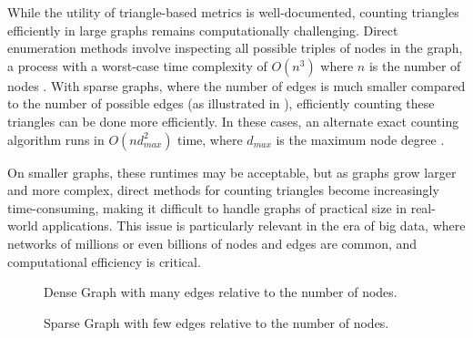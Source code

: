 \documentclass[11pt, margin=1in]{article}
\begin{document}
While the utility of triangle-based metrics is well-documented, counting triangles efficiently in large graphs remains computationally challenging.
Direct enumeration methods involve inspecting all possible triples of nodes in the graph, a process with a worst-case time complexity of $O(n^3)$ where $n$ is the number of nodes \cite{al_hasan_triangle_2018}.
With sparse graphs, where the number of edges is much smaller compared to the number of possible edges (as illustrated in ), efficiently counting these triangles can be done more efficiently.
In these cases, an alternate exact counting algorithm runs in $O(nd_{max}^2)$ time, where $d_{max}$ is the maximum node degree \cite{schank_finding_2005}.

On smaller graphs, these runtimes may be acceptable, but as graphs grow larger and more complex, direct methods for counting triangles become increasingly time-consuming, making it difficult to handle graphs of practical size in real-world applications.
This issue is particularly relevant in the era of big data, where networks of millions or even billions of nodes and edges are common, and computational efficiency is critical.

\begin{figure}[H]
    \centering
    \begin{minipage}{0.45\textwidth}
        \centering
        \caption{Dense Graph with many edges relative to the number of nodes.}
        \label{fig:dense_graph}
    \end{minipage}%
    \hspace{0.5cm}
    \begin{minipage}{0.45\textwidth}
        \centering
        \caption{Sparse Graph with few edges relative to the number of nodes.}
        \label{fig:sparse_graph}
    \end{minipage}
\end{figure}
\end{document}
